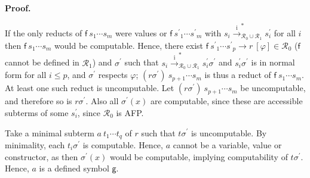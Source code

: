  
 
 
\par\medskip\noindent\textbf{Proof.}\par
 
 
If the only reducts of ${\mathsf{f}}\ {{s}_{1}\cdots{s}_{m}}$ were values or ${\mathsf{f}}\ {{s^{\prime}}_{1}\cdots{s^{\prime}}_{m}}$ with $s_{i}\xrightarrow{\scriptscriptstyle\mathrm{i}}_{\mathcal{R}_{0}\cup\mathcal{R}_{1}}^{*}s_{i}^{\prime}$ for all $i$ then ${\mathsf{f}}\ {{s}_{1}\cdots{s}_{m}}$ would be computable. Hence, there exist ${{\mathsf{f}}\ {{s^{\prime}}_{1}\cdots{s^{\prime}}_{p}}}\rightarrow{r}\ [\varphi]\in\mathcal{R}_{0}$ ($\mathsf{f}$ cannot be defined in $\mathcal{R}_{1}$) and $\sigma^{\prime}$ such that $s_{i}\xrightarrow{\scriptscriptstyle\mathrm{i}}_{\mathcal{R}_{0}\cup\mathcal{R}_{1}}^{*}s_{i}^{\prime}\sigma^{\prime}$ and $s_{i}^{\prime}\sigma^{\prime}$ is in normal form for all $i\leq p$, and $\sigma^{\prime}$ respects $\varphi$; ${(r\sigma^{\prime})}\ {{s}_{p+1}\cdots{s}_{m}}$ is thus a reduct of ${\mathsf{f}}\ {{s}_{1}\cdots{s}_{m}}$. At least one such reduct is uncomputable. Let ${(r\sigma^{\prime})}\ {{s}_{p+1}\cdots{s}_{m}}$ be uncomputable, and therefore so is $r\sigma^{\prime}$. Also all $\sigma^{\prime}(x)$ are computable, since these are accessible subterms of some $s_{i}^{\prime}$, since $\mathcal{R}_{0}$ is AFP.\par
 
 
 
Take a minimal subterm ${a}\ {{t}_{1}\cdots{t}_{q}}$ of $r$ such that $t\sigma^{\prime}$ is uncomputable. By minimality, each $t_{i}\sigma^{\prime}$ is computable. Hence, $a$ cannot be a variable, value or constructor, as then $\sigma^{\prime}(x)$ would be computable, implying computability of $t\sigma^{\prime}$. Hence, $a$ is a defined symbol $\mathsf{g}$.\par
 
 
 
